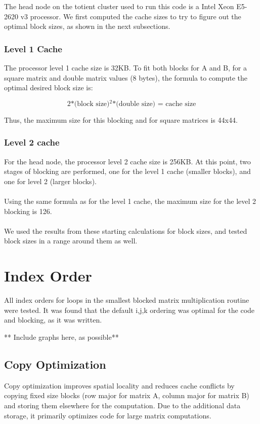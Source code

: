 \documentclass{article}	 %
\begin{document}
\noindent The head node on the totient cluster used to run this code is a Intel Xeon E5-2620 v3 processor. We first computed the cache sizes to try to figure out the optimal block sizes, as shown in the next subsections. 

\subsubsection{Level 1 Cache}
The processor level 1 cache size is 32KB. To fit both blocks for A and B, for a square matrix and double matrix values (8 bytes), the formula to compute the optimal desired block size is:

\begin{equation}
\text{2*(block size)$^2$*(double size) = cache size}
\end{equation}

\noindent Thus, the maximum size for this blocking and for square matrices is 44x44.

\subsubsection{Level 2 cache}
For the head node, the processor level 2 cache size is 256KB. At this point, two stages of blocking are performed, one for the level 1 cache (smaller blocks), and one for level 2 (larger blocks). \\ \\

Using the same formula as for the level 1 cache, the maximum size for the level 2 blocking is 126. \\ \\

We used the results from these starting calculations for block sizes, and tested block sizes in a range around them as well. 

\section{Index Order}
All index orders for loops in the smallest blocked matrix multiplication routine were tested. It was found that the default i,j,k ordering was optimal for the code and blocking, as it was written.

** Include graphs here, as possible**

\subsection{Copy Optimization}
Copy optimization improves spatial locality and reduces cache conflicts by copying fixed size blocks (row major for matrix A, column major for matrix B) and storing them elsewhere for the computation. Due to the additional data storage, it primarily optimizes code for large matrix computations. 
\end{document}
